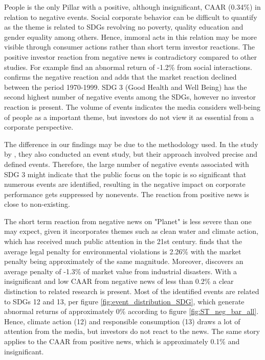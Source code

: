 People is the only Pillar with a positive, although insignificant, CAAR (0.34\%) in relation to negative events. Social corporate behavior can be difficult to quantify as the theme is related to SDGs revolving no poverty, quality education and gender equality among others. Hence, immoral acts in this relation may be more visible through consumer actions rather than short term investor reactions. The positive investor reaction from negative news is contradictory compared to other studies. For example \cite{chen2001layoffs} find an abnormal return of -1.2\% from social interactions. \citep{farber2009changing} confirms the negative reaction and adds that the market reaction declined between the period 1970-1999. SDG 3 (Good Health and Well Being) has the second highest number of negative events among the SDGs, however no investor reaction is present. The volume of events indicates the media considers well-being of people as a important theme, but investors do not view it as essential from a corporate perspective.

The difference in our findings may be due to the methodology used. In the study by \citeauthor{chen2001layoffs}, they also conducted an event study, but their approach involved precise and defined events. Therefore, the large number of negative events associated with SDG 3 might indicate that the public focus on the topic is so significant that numerous events are identified, resulting in the negative impact on corporate performance gets suppressed by nonevents. The reaction from positive news is close to non-existing. 

The short term reaction from negative news on "Planet" is less severe than one may expect, given it incorporates themes such as clean water and climate action, which has received much public attention in the 21st century. \cite{karpoff2005reputational} finds that the average legal penalty for environmental violations is 2.26\% with the market penalty being approximately of the same magnitude. Moreover, \cite{capelle2010does} discovers an average penalty of -1.3\% of market value from industrial disasters. With a insignificant and low CAAR from negative news of less than 0.2\% a clear distinction to related research is present. Most of the identified events are related to SDGs 12 and 13, per figure \ref{fig:event_distribution_SDG}, which generate abnormal returns of approximately 0\% according to figure \ref{fig:ST_neg_bar_all}. Hence, climate action (12) and responsible consumption (13) draws a lot of attention from the media, but investors do not react to the news. The same story applies to the CAAR from positive news, which is approximately 0.1\% and insignificant. 

